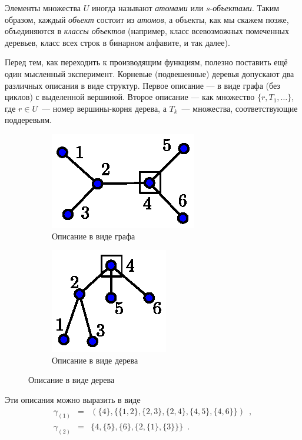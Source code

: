 \documentclass[a5paper]{article}
\theoremstyle{definition}
\begin{document}
Элементы множества \( U \) иногда называют \textit{атомами} или \( s 
\)-\textit{объектами}. Таким образом, каждый \textit{объект} состоит из 
\textit{атомов}, а объекты, как мы скажем позже, объединяются в \textit{классы 
объектов} (например, класс всевозможных помеченных деревьев, класс всех строк в 
бинарном алфавите, и так далее).

Перед тем, как переходить к производящим функциям, полезно 
поставить ещё один мысленный эксперимент. Корневые (подвешенные) деревья 
допускают два различных описания в виде структур. Первое описание --- в виде 
графа (без циклов) с выделенной вершиной. Второе описание --- как множество \( 
\{ r, T_1, \ldots \} \), где \( r \in U \)~--- номер вершины-корня дерева, а \( 
T_k \)~--- множества, соответствующие поддеревьям.

	\begin{figure}[h]
	\centering
    \begin{subfigure}{.5\textwidth}
    	\centering
		\includegraphics[width=.5\textwidth]{structure_isomorphism_1.eps}
		\caption{Описание в виде графа}
		\label{fig:iso_1}	
	\end{subfigure}%
    \begin{subfigure}{.34\textwidth}
		\centering
		\includegraphics[width=.5\textwidth]{structure_isomorphism_2.eps}
		\caption{Описание в виде дерева}
		\label{fig:iso_2}	
	\end{subfigure}%
    \end{figure}

Эти описания можно выразить в виде
\begin{eqnarray*}
	\gamma_{(1)} &=& (
		\{ 4 \}, \{ \{ 1,2 \}, \{2,3\}, \{2,4\}, \{4,5\}, \{4,6\} \}
	) \enspace ,\\
	\gamma_{(2)} &=& \{
		4, \{5\}, \{6\}, \{
			2, \{1\}, \{3\}
		\}
	\} \enspace .
\end{eqnarray*}
\end{document}
